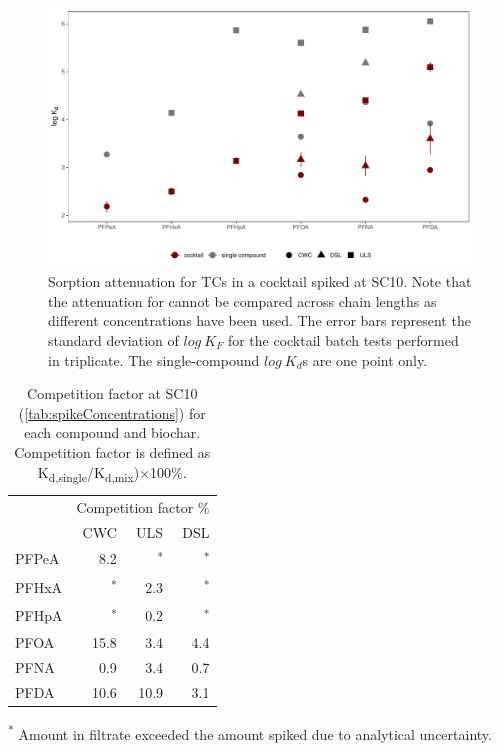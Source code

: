 \begin{figure}
    \centering
    \includegraphics[width=\textwidth]{R/figs/C10_mixVsSingle_BC_plot.pdf}
    \caption{Sorption attenuation for TCs in a cocktail spiked at SC10. Note that the attenuation for cannot be compared across chain lengths as different concentrations have been used. The error bars represent the standard deviation of $log~K_F$ for the cocktail batch tests performed in triplicate. The single-compound $log~K_d$s are one point only.}
    \label{fig:competition}
\end{figure}

\begin{table}
\centering
\caption{Competition factor at SC10 (\cref{tab:spikeConcentrations}) for each compound and biochar. Competition factor is defined as K\textsubscript{d,single}/K\textsubscript{d,mix})$\times$100\%.}
\begin{threeparttable}
\label{tab:competition}
\begin{tabular}{lrrr}
\toprule
 & \multicolumn{3}{c}{Competition factor \%} \\ \cmidrule(l){2-4}
 & CWC & ULS & DSL \\ \midrule
PFPeA & 8.2 & \textsuperscript{*} & \textsuperscript{*} \\
PFHxA & \textsuperscript{*} & 2.3 & \textsuperscript{*} \\
PFHpA & \textsuperscript{*} & 0.2 & \textsuperscript{*} \\
PFOA & 15.8 & 3.4 & 4.4 \\
PFNA & 0.9 & 3.4 & 0.7 \\
PFDA & 10.6 & 10.9 & 3.1 \\ \bottomrule
\end{tabular}
\begin{tablenotes}
\item \textsuperscript{*} Amount in filtrate exceeded the amount spiked due to analytical uncertainty.
\end{tablenotes}
\end{threeparttable}
\end{table}

